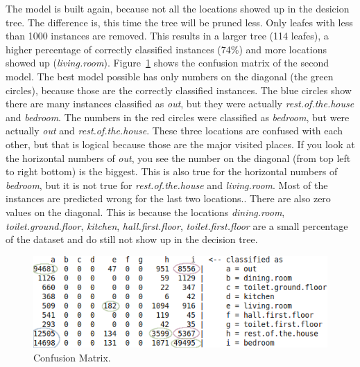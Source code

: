 	The model is built again, because not all the locations showed up in the desicion tree. The difference is, this time the tree will be pruned less. Only leafes with less than 1000 instances are removed. This results in a larger tree (114 leafes), a higher percentage of correctly classified instances (74\%) and more locations showed up (\emph{living.room}). Figure~\ref{fig:confusionmatrix} shows the confusion matrix of the second model. The best model possible has only numbers on the diagonal (the green circles), because those are the correctly classified instances. The blue circles show there are many instances classified as \emph{out}, but they were actually \emph{rest.of.the.house} and \emph{bedroom}. The numbers in the red circles were classified as \emph{bedroom}, but were actually \emph{out} and \emph{rest.of.the.house}. These three locations are confused with each other, but that is logical because those are the major visited places. If you look at the horizontal numbers of \emph{out}, you see the number on the diagonal (from top left to right bottom) is the biggest. This is also true for the horizontal numbers of \emph{bedroom}, but it is not true for \emph{rest.of.the.house} and \emph{living.room}. Most of the instances are predicted wrong for the last two locations.. There are also zero values on the diagonal. This is because the locations \emph{dining.room}, \emph{toilet.ground.floor}, \emph{kitchen}, \emph{hall.first.floor}, \emph{toilet.first.floor} are a small percentage of the dataset and do still not show up in the decision tree.

			\begin{figure}[h]
				\centering
					\includegraphics[scale=0.7]{confusion.png}
					
				\caption{Confusion Matrix.}
				\label{fig:confusionmatrix}

			\end{figure}


